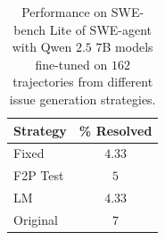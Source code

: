 \begin{table}[h]
    \centering
    \begin{tabular}{l|c}
\toprule
Strategy & \% Resolved \\
\midrule
Fixed        & $4.33$ \\
F2P Test     & $5$ \\
LM           & $4.33$ \\
Original     & $7$ \\
\bottomrule
    \end{tabular}
    \caption{
    Performance on SWE-bench Lite of SWE-agent with Qwen $2.5$ $7$B models fine-tuned on $162$ trajectories from different issue generation strategies.
    }
    \label{tab:issue_gen_lite}
\end{table}